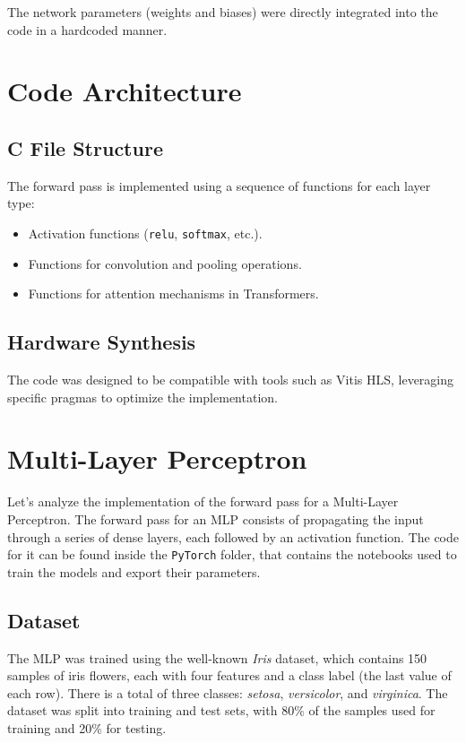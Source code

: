 \documentclass{article}
\begin{document}
The network parameters (weights and biases) were directly integrated into the code in a hardcoded manner.

\section{Code Architecture}
\subsection{C File Structure}
The forward pass is implemented using a sequence of functions for each layer type:
\begin{itemize}
    \item Activation functions (\texttt{relu}, \texttt{softmax}, etc.).
    \item Functions for convolution and pooling operations.
    \item Functions for attention mechanisms in Transformers.
\end{itemize}


\subsection{Hardware Synthesis}
The code was designed to be compatible with tools such as Vitis HLS, leveraging specific pragmas to optimize the implementation.

\section{Multi-Layer Perceptron}
Let's analyze the implementation of the forward pass for a Multi-Layer Perceptron. The forward pass for an MLP consists of propagating the input through a series of dense layers, each followed by an activation function.
The code for it can be found inside the \texttt{PyTorch} folder, that contains the notebooks used to train the models and export their parameters.

\subsection{Dataset}
The MLP was trained using the well-known \textit{Iris} dataset, which contains 150 samples of iris flowers, each with four features and a class label (the last value of each row).
There is a total of three classes: \textit{setosa}, \textit{versicolor}, and \textit{virginica}.
The dataset was split into training and test sets, with 80\% of the samples used for training and 20\% for testing.
\end{document}

